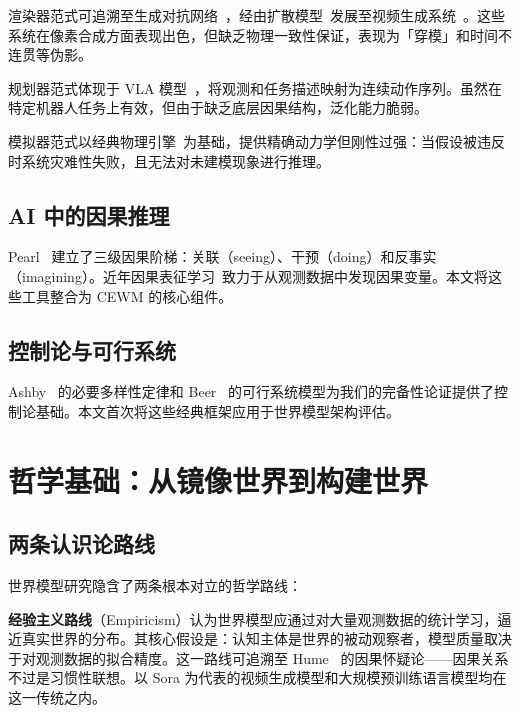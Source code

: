 \documentclass[11pt,a4paper]{article}
\newcommand{\CEWM}{\textsc{CEWM}}
\begin{document}
渲染器范式可追溯至生成对抗网络~\citep{goodfellow2014gan}，经由扩散模型~\citep{ho2020ddpm}发展至视频生成系统~\citep{openai2024sora}。这些系统在像素合成方面表现出色，但缺乏物理一致性保证，表现为「穿模」和时间不连贯等伪影。

规划器范式体现于 VLA 模型~\citep{brohan2023rt2}，将观测和任务描述映射为连续动作序列。虽然在特定机器人任务上有效，但由于缺乏底层因果结构，泛化能力脆弱。

模拟器范式以经典物理引擎~\citep{todorov2012mujoco}为基础，提供精确动力学但刚性过强：当假设被违反时系统灾难性失败，且无法对未建模现象进行推理。

\subsection{AI 中的因果推理}

Pearl~\citeyearpar{pearl2009causality} 建立了三级因果阶梯：关联（seeing）、干预（doing）和反事实（imagining）。近年因果表征学习~\citep{scholkopf2021causal}致力于从观测数据中发现因果变量。本文将这些工具整合为 \CEWM{} 的核心组件。

\subsection{控制论与可行系统}

Ashby~\citeyearpar{ashby1956cybernetics} 的必要多样性定律和 Beer~\citeyearpar{beer1979heart} 的可行系统模型为我们的完备性论证提供了控制论基础。本文首次将这些经典框架应用于世界模型架构评估。

\section{哲学基础：从镜像世界到构建世界}\label{sec:philosophy}

\subsection{两条认识论路线}

世界模型研究隐含了两条根本对立的哲学路线：

\textbf{经验主义路线}（Empiricism）认为世界模型应通过对大量观测数据的统计学习，逼近真实世界的分布。其核心假设是：认知主体是世界的被动观察者，模型质量取决于对观测数据的拟合精度。这一路线可追溯至 Hume~\citeyearpar{hume1739treatise} 的因果怀疑论——因果关系不过是习惯性联想。以 Sora 为代表的视频生成模型和大规模预训练语言模型均在这一传统之内。
\end{document}
